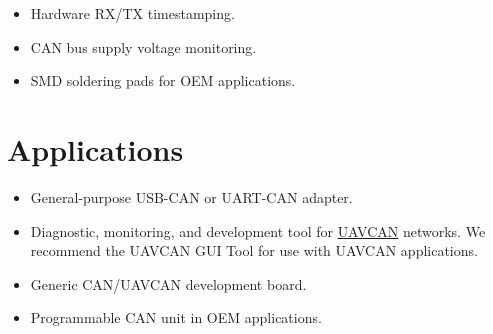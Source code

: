 \documentclass{zubaxdoc}
\begin{document}
\begin{titlepage}
\begin{itemize}
    \item Hardware RX/TX timestamping.

    \item CAN bus supply voltage monitoring.

    \item SMD soldering pads for OEM applications.
\end{itemize}

\BeginRightColumn

\section*{Applications}

\begin{itemize}
    \item General-purpose USB-CAN or UART-CAN adapter.
    \item Diagnostic, monitoring, and development tool for \href{http://uavcan.org}{UAVCAN} networks.
          We recommend the UAVCAN GUI Tool for use with UAVCAN applications.
    \item Generic CAN/UAVCAN development board.
    \item Programmable CAN unit in OEM applications.
\end{itemize}


\end{titlepage}
\end{document}
